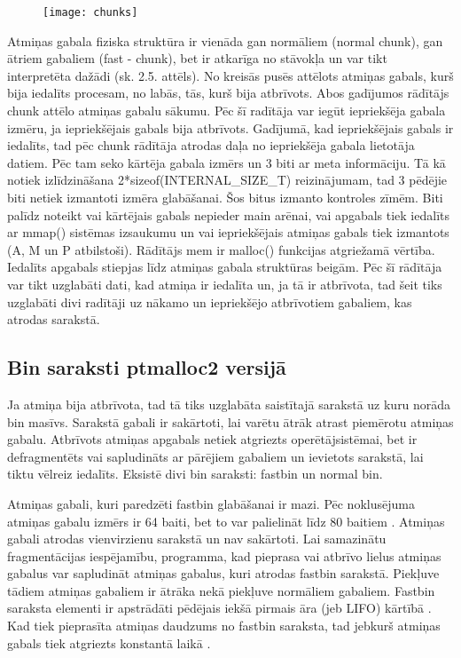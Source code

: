 \begin{figure}[h]
\begin{center}
\texttt{[image: chunks]}
\end{center}
\caption{\textbf{\fontsize{11}{12}\selectfont {Atmiņas gabalu struktūra}}}
\label{fig:chunks}
\end{figure}

Atmiņas gabala fiziska struktūra ir vienāda gan normāliem (normal chunk), gan ātriem gabaliem (fast - chunk), bet ir atkarīga no stāvokļa un var tikt interpretēta dažādi (sk. 2.5. attēls).
No kreisās pusēs attēlots atmiņas gabals, kurš bija iedalīts procesam, no labās, tās, kurš bija atbrīvots.
Abos gadījumos rādītājs chunk attēlo atmiņas gabalu sākumu. Pēc šī radītāja var iegūt iepriekšēja gabala izmēru, ja iepriekšējais gabals bija atbrīvots.
Gadījumā, kad iepriekšējais gabals ir iedalīts, tad pēc chunk rādītāja atrodas daļa no iepriekšēja gabala lietotāja datiem. 
Pēc tam seko kārtēja gabala izmērs un 3 biti ar meta informāciju. 
Tā kā notiek izlīdzināšana 2*sizeof(INTERNAL\_SIZE\_T)  reizinājumam, tad 3 pēdējie biti netiek izmantoti izmēra glabāšanai. 
Šos bitus izmanto kontroles zīmēm.
Biti palīdz noteikt vai kārtējais gabals nepieder main arēnai, vai apgabals tiek iedalīts ar mmap() sistēmas izsaukumu un vai iepriekšējais atmiņas gabals tiek izmantots (A, M un P atbilstoši).
Rādītājs mem ir malloc() funkcijas atgriežamā vērtība. Iedalīts apgabals stiepjas līdz atmiņas gabala struktūras beigām.
Pēc šī rādītāja var tikt uzglabāti dati, kad atmiņa ir iedalīta un, ja tā ir atbrīvota, tad šeit tiks uzglabāti divi radītāji uz nākamo un iepriekšējo atbrīvotiem gabaliem, kas atrodas sarakstā. 
 
 \subsection{Bin saraksti ptmalloc2 versijā}
Ja atmiņa bija atbrīvota, tad tā tiks uzglabāta saistītajā sarakstā uz kuru norāda bin masīvs.
Sarakstā gabali ir sakārtoti, lai varētu ātrāk atrast piemērotu atmiņas gabalu.
Atbrīvots atmiņas apgabals netiek atgriezts operētājsistēmai, bet ir defragmentēts vai sapludināts ar pārējiem gabaliem un ievietots sarakstā, lai tiktu vēlreiz iedalīts. Eksistē divi bin saraksti: fastbin un normal bin.

Atmiņas gabali, kuri paredzēti fastbin glabāšanai ir mazi. Pēc noklusējuma atmiņas gabalu izmērs ir 64 baiti, bet to var palielināt līdz 80 baitiem \cite {MALLOC}. 
Atmiņas gabali atrodas vienvirzienu sarakstā un nav sakārtoti. 
Lai samazinātu fragmentācijas iespējamību, programma, kad pieprasa vai atbrīvo lielus atmiņas gabalus var sapludināt atmiņas gabalus, kuri atrodas fastbin sarakstā.
Piekļuve tādiem atmiņas gabaliem ir ātrāka nekā piekļuve normāliem gabaliem. 
Fastbin saraksta elementi ir apstrādāti pēdējais iekšā pirmais āra (jeb LIFO) kārtībā \cite {Binning}.
Kad tiek pieprasīta atmiņas daudzums no fastbin saraksta, tad jebkurš atmiņas gabals tiek atgriezts konstantā laikā  \cite {ACCA}.

